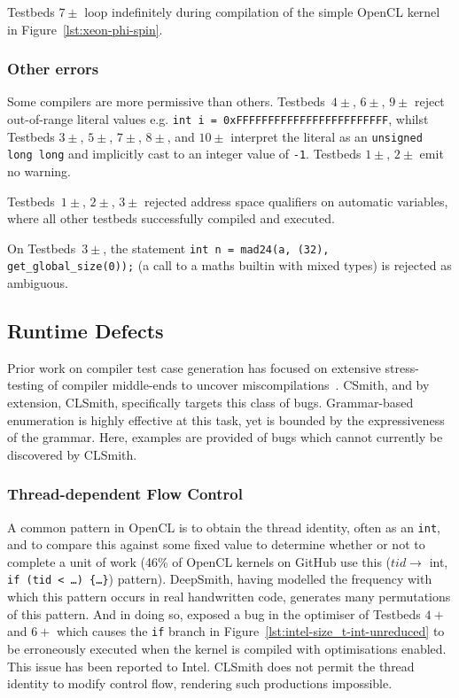 Testbeds $7\pm$ loop indefinitely during compilation of the simple OpenCL kernel in Figure~\ref{lst:xeon-phi-spin}.

\subsubsection{Other errors}

Some compilers are more permissive than others. Testbeds~$4\pm$, $6\pm$, $9\pm$ reject out-of-range literal values e.g. \texttt{int i = 0xFFFFFFFFFFFFFFFFFFFFFFFF}, whilst Testbeds $3\pm$, $5\pm$, $7\pm$, $8\pm$, and $10\pm$ interpret the literal as an \texttt{unsigned long long} and implicitly cast to an integer value of \texttt{-1}. Testbeds $1\pm$, $2\pm$ emit no warning.

Testbeds~$1\pm$, $2\pm$, $3\pm$ rejected address space qualifiers on automatic variables, where all other testbeds successfully compiled and executed.

On Testbeds~$3\pm$, the statement \texttt{int n = mad24(a, (32), get\_global\_size(0));} (a call to a maths builtin with mixed types) is rejected as ambiguous.


\subsection{Runtime Defects}

Prior work on compiler test case generation has focused on extensive stress-testing of compiler middle-ends to uncover miscompilations~\cite{Chen2014a}. CSmith, and by extension, CLSmith, specifically targets this class of bugs. Grammar-based enumeration is highly effective at this task, yet is bounded by the expressiveness of the grammar. Here, examples are provided of bugs which cannot currently be discovered by CLSmith.


\subsubsection{Thread-dependent Flow Control}

A common pattern in OpenCL is to obtain the thread identity, often as an \texttt{int}, and to compare this against some fixed value to determine whether or not to complete a unit of work (46\% of OpenCL kernels on GitHub use this ($tid \rightarrow$ int, \texttt{if (tid < \ldots) \{\ldots\}}) pattern). DeepSmith, having modelled the frequency with which this pattern occurs in real handwritten code, generates many permutations of this pattern. And in doing so, exposed a bug in the optimiser of Testbeds $4+$ and $6+$ which causes the \texttt{if} branch in Figure~\ref{lst:intel-size_t-int-unreduced} to be erroneously executed when the kernel is compiled with optimisations enabled. This issue has been reported to Intel. CLSmith does not permit the thread identity to modify control flow, rendering such productions impossible.

